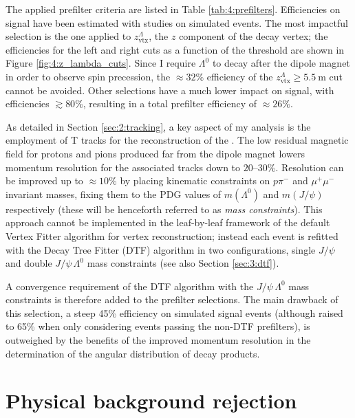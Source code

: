 The applied prefilter criteria are listed in Table \ref{tab:4:prefilters}.
Efficiencies on signal have been estimated with studies on simulated \demonstratorshort events.
The most impactful selection is the one applied to $z_\text{vtx}^\Lambda$, the $z$ component of the \lambdadecay decay vertex;
the efficiencies for the left and right cuts as a function of the threshold are shown in Figure \ref{fig:4:z_lambda_cuts}.
Since I require $\Lambda^0$ to decay after the dipole magnet in order to observe spin precession, the $\approx 32\%$ efficiency of the $z_\text{vtx}^\Lambda \geq \SI{5.5}{\meter}$ cut cannot be avoided.
Other selections have a much lower impact on signal, with efficiencies $\gtrsim 80\%$, resulting in a total prefilter efficiency of $\approx 26\%$.

As detailed in Section \ref{sec:2:tracking}, a key aspect of my analysis is the employment of T tracks for the reconstruction of the \lz.
The low residual magnetic field for protons and pions produced far from the dipole magnet lowers momentum resolution for the associated tracks down to $20$--$30\%$.
Resolution can be improved up to $\approx 10\%$ by placing kinematic constraints on $p\pi^-$ and $\mu^+ \mu^-$ invariant masses, fixing them to the PDG values of $m(\Lambda^0)$ and $m(J/\psi)$ respectively (these will be henceforth referred to as \textit{mass constraints}).
This approach cannot be implemented in the leaf-by-leaf framework of the default Vertex Fitter algorithm for vertex reconstruction;
instead each event is refitted with the Decay Tree Fitter (DTF) algorithm in two configurations, single $J/\psi$ and double $J/\psi\,\Lambda^0$ mass constraints (see also Section \ref{sec:3:dtf}).

A convergence requirement of the DTF algorithm with the $J/\psi\,\Lambda^0$ mass constraints is therefore added to the prefilter selections.
The main drawback of this selection, a steep 45\% efficiency on simulated signal events (although raised to 65\% when only considering events passing the non-DTF prefilters), is outweighed by the benefits of the improved momentum resolution in the determination of the angular distribution of \lambdadecay decay products.

\section{Physical background rejection}
\label{sec:4:phys_bkg}


